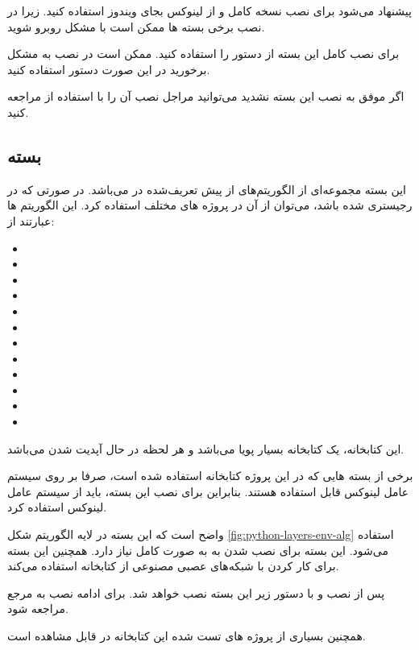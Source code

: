 \begin{note}
پیشنهاد می‌شود برای نصب نسخه کامل  و  از لینوکس بجای ویندوز استفاده کنید. زیرا در نصب برخی بسته ها ممکن است با مشکل روبرو شوید.
\end{note}

برای نصب کامل این بسته از دستور  را استفاده کنید. ممکن است در نصب  به مشکل برخورید در این صورت دستور  استفاده کنید.

اگر موفق به نصب این بسته نشدید می‌توانید مراجل نصب آن را با استفاده از 
\cite{medgyminstall}
مراجعه کنید.


\subsection{بسته }
این بسته مجموعه‌ای از الگوریتم‌های از پیش تعریف‌شده در  می‌باشد. در صورتی که  در  رجیستری شده باشد، می‌توان از آن در پروژه های مختلف استفاده کرد. این الگوریتم ها عبارتند از:

\begin{multicols}{3}
\begin{itemize}
\item {}
\item {}
\item {}
\item {}
\item {}
\item {}
\item {}
\item {}
\item {}
\item {}
\item {}
\item {}
\end{itemize}
\end{multicols}

این کتابخانه، یک کتابخانه بسیار پویا می‌باشد و هر لحظه در حال آپدیت شدن می‌باشد.

\begin{remark}
	برخی از بسته هایی که در این پروژه کتابخانه استفاده شده است، صرفا بر روی سیستم عامل لینوکس قابل استفاده هستند. بنابراین برای نصب این بسته، باید از سیستم عامل لینوکس استفاده کرد.
\end{remark}

واضح است که این بسته در لایه الگوریتم شکل \ref{fig:python-layers-env-alg} استفاده می‌شود. این بسته برای نصب شدن به  به صورت کامل نیاز دارد. همچنین این بسته برای کار کردن با شبکه‌های عصبی مصنوعی از کتابخانه  استفاده می‌کند.

پس از نصب  و  با دستور زیر این بسته نصب خواهد شد.
برای ادامه نصب به مرجع  \cite{stable-baselines-doc} مراجعه شود.

همچنین بسیاری از پروژه های تست شده این کتابخانه در \cite{stable-baselines-med} قابل مشاهده است.



